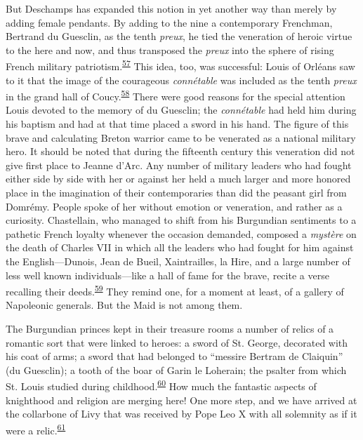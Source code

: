 But Deschamps has expanded this notion in yet another way than merely by
adding female pendants. By adding to the nine a contemporary Frenchman,
Bertrand du Guesclin, as the tenth \emph{preux}, he tied the veneration
of heroic virtue to the here and now, and thus transposed the
\emph{preux} into the sphere of rising French military
patriotism.\textsuperscript{\protect\hypertarget{10_Chapter_Three__THE_HEROIC_DREAM.xhtmlux5cux23id_1819}{\protect\hyperlink{23_NOTES.xhtmlux5cux23id_1820}{57}}}
This idea, too, was successful: Louis of Orléans saw to it that the
image of the courageous \emph{connétable} was included as the tenth
\emph{preux} in the grand hall of
Coucy.\textsuperscript{\protect\hypertarget{10_Chapter_Three__THE_HEROIC_DREAM.xhtmlux5cux23id_1817}{\protect\hyperlink{23_NOTES.xhtmlux5cux23id_1818}{58}}}
There were good reasons for the special attention Louis devoted to the
memory of du Guesclin; the \emph{connétable} had held him during his
baptism and had at that time placed a sword in his hand. The figure of
this brave and calculating Breton warrior came to be venerated as a
national military hero. It should be noted that during the fifteenth
century this veneration did not give first place to Jeanne d'Arc. Any
number of military leaders who had fought either side by side with her
or against her held a much larger and more honored place in the
imagination of their contemporaries than did the peasant girl from
Domrémy. People spoke of her without emotion or veneration, and rather
as a curiosity. Chastellain, who managed to shift from his Burgundian
sentiments to a pathetic French loyalty whenever the occasion demanded,
composed a \emph{mystère} on the death of Charles VII in which all the
leaders who had fought for him against the English---Dunois, Jean de
Bueil, Xaintrailles, la Hire, and a large number of less well known
individuals---like a hall of fame
\protect\hypertarget{10_Chapter_Three__THE_HEROIC_DREAM.xhtmlux5cux23page_78}{}{}for
the brave, recite a verse recalling their
deeds.\textsuperscript{\protect\hypertarget{10_Chapter_Three__THE_HEROIC_DREAM.xhtmlux5cux23id_1815}{\protect\hyperlink{23_NOTES.xhtmlux5cux23id_1816}{59}}}
They remind one, for a moment at least, of a gallery of Napoleonic
generals. But the Maid is not among them.

The Burgundian princes kept in their treasure rooms a number of relics
of a romantic sort that were linked to heroes: a sword of St. George,
decorated with his coat of arms; a sword that had belonged to ``messire
Bertram de Claiquin'' (du Guesclin); a tooth of the boar of Garin le
Loherain; the psalter from which St. Louis studied during
childhood.\textsuperscript{\protect\hypertarget{10_Chapter_Three__THE_HEROIC_DREAM.xhtmlux5cux23id_1813}{\protect\hyperlink{23_NOTES.xhtmlux5cux23id_1814}{60}}}
How much the fantastic aspects of knighthood and religion are merging
here! One more step, and we have arrived at the collarbone of Livy that
was received by Pope Leo X with all solemnity as if it were a
relic.\textsuperscript{\protect\hypertarget{10_Chapter_Three__THE_HEROIC_DREAM.xhtmlux5cux23id_1811}{\protect\hyperlink{23_NOTES.xhtmlux5cux23id_1812}{61}}}

